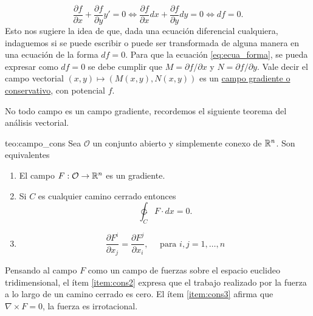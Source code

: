\[
 \frac{\partial f}{\partial x}+\frac{\partial f}{\partial y}y'=0\Longleftrightarrow \frac{\partial f}{\partial x}dx+\frac{\partial f}{\partial y}dy=0
 \Longleftrightarrow df=0.
\]
 Esto  nos sugiere la idea de que, dada una ecuación diferencial cualquiera, indaguemos si se puede escribir o puede ser transformada de alguna manera en una ecuación de la forma $df=0$.  Para que la ecuación \eqref{eq:ecua_forma}, se pueda expresar como $df=0$ se debe cumplir que  $M=\partial f/\partial x$ y $N=\partial f/\partial y$.
 Vale decir el campo vectorial $(x,y)\mapsto (M(x,y),N(x,y))$ es un \href{http://es.wikipedia.org/wiki/Fuerza_conservativa}{campo
gradiente o conservativo}, con potencial $f$.

No todo campo es un campo gradiente, recordemos el siguiente teorema del análisis vectorial.

 \begin{teorema}{teo:campo_cons} Sea $\mathcal{O}$ un conjunto abierto y simplemente conexo de $\rr^n$. Son equivalentes
 \begin{enumerate}
  \item\label{item:cons1} El campo $F:\mathcal{O}\to\rr^n$ es un gradiente.
  \item\label{item:cons2} Si $C$ es cualquier camino cerrado entonces
  \[\ointctrclockwise_C F\cdot d x=0.\]
  \item\label{item:cons3} \[\frac{\partial F^i}{\partial x_j}=\frac{\partial F^j}{\partial x_i},\quad\text{ para }i,j=1,\ldots,n\]
 \end{enumerate}

\end{teorema}

Pensando al campo $F$ como un campo de  fuerzas sobre el espacio euclideo tridimensional,  el ítem \ref{item:cons2} expresa que el trabajo realizado por la fuerza a lo largo de un camino cerrado es cero. El ítem \ref{item:cons3} afirma que $\nabla\times F=0$, la fuerza es irrotacional.


